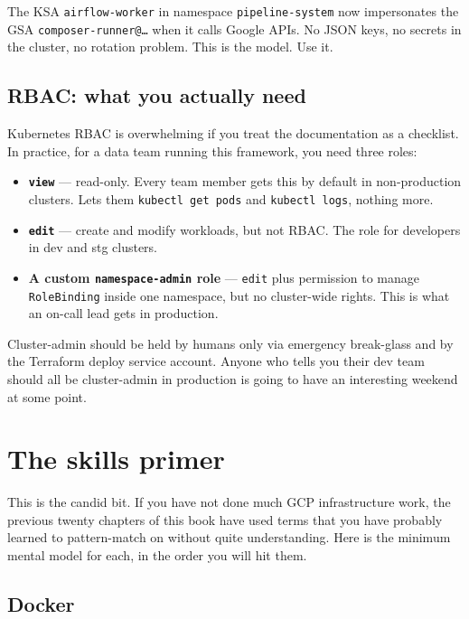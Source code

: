 \documentclass[
  11pt,
  british,
  oneside]{book}
\providecommand{\tightlist}{%
  \setlength{\itemsep}{0pt}\setlength{\parskip}{0pt}}
\begin{document}
The KSA \texttt{airflow-worker} in namespace \texttt{pipeline-system}
now impersonates the GSA \texttt{composer-runner@\ldots{}} when it calls
Google APIs. No JSON keys, no secrets in the cluster, no rotation
problem. This is the model. Use it.

\hypertarget{rbac-what-you-actually-need}{%
\subsection{RBAC: what you actually
need}\label{rbac-what-you-actually-need}}

Kubernetes RBAC is overwhelming if you treat the
documentation as a checklist. In practice, for a data team running this
framework, you need three roles:

\begin{itemize}
\tightlist
\item
  \textbf{\texttt{view}} --- read-only. Every team member gets this by
  default in non-production clusters. Lets them
  \texttt{kubectl\ get\ pods} and \texttt{kubectl\ logs}, nothing more.
\item
  \textbf{\texttt{edit}} --- create and modify workloads, but not RBAC.
  The role for developers in dev and stg clusters.
\item
  \textbf{A custom \texttt{namespace-admin} role} --- \texttt{edit} plus
  permission to manage \texttt{RoleBinding} inside one namespace, but no
  cluster-wide rights. This is what an on-call lead gets in production.
\end{itemize}

Cluster-admin should be held by humans only via emergency break-glass
and by the Terraform deploy service account. Anyone who tells you their
dev team should all be cluster-admin in production is going to have an
interesting weekend at some point.

\hypertarget{the-skills-primer}{%
\section{The skills primer}\label{the-skills-primer}}

This is the candid bit. If you have not done much GCP infrastructure
work, the previous twenty chapters of this book have used terms that you
have probably learned to pattern-match on without quite understanding.
Here is the minimum mental model for each, in the order you will hit
them.

\hypertarget{docker}{%
\subsection{Docker}\label{docker}}
\end{document}
